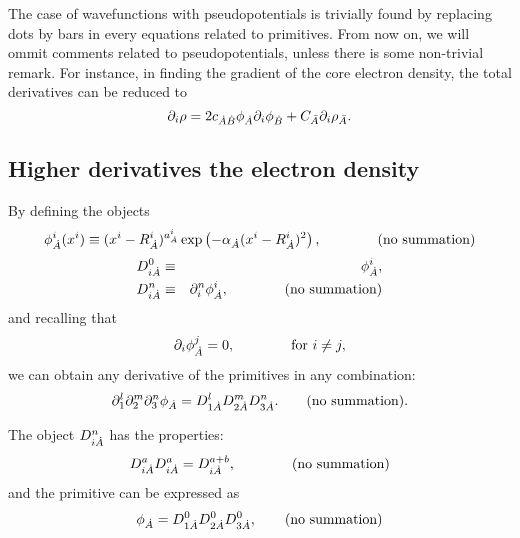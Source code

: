The case of wavefunctions with pseudopotentials is trivially found by replacing 
dots by bars in every equations related to primitives. From now on, we will ommit
comments related to pseudopotentials, unless there is some non-trivial remark.
For instance, in finding the gradient of the core electron density, the total
derivatives can be reduced to
%
\begin{equation}%
   \partial_i\rho=2c_{\dA\dB}\phi_{\dA}\partial_i\phi_{\dB}
   +C_{\bA}\partial_i\rho_{\bA}.
\end{equation}
%


\subsection{Higher derivatives the electron density}

By defining the objects
%
\begin{equation}
   \phi^i_{\dot{A}}(x^i)\equiv(x^i-R^i_{\dot{A}})^{a^i_{\dot{A}}}\exp\left(-\alpha_{\dot{A}}(x^i-R^i_{\dot{A}})^2\right),
   \qquad\qquad\textrm{(no summation)}
\end{equation}
%
%
\begin{eqnarray}
  D_{i\dot{A}}^0&\equiv&\phi^i_{\dot{A}},\nonumber\\
   D_{i\dot{A}}^n&\equiv&\partial_i^n\phi^i_{\dot{A}},\qquad\qquad\textrm{(no summation)}
\end{eqnarray}
%
and recalling that
%
\begin{equation}
   \partial_i\phi^j_{\dot{A}}=0,\qquad\qquad\textrm{for }i\neq j,
\end{equation}
%
we can obtain any derivative of the primitives in any combination:
%
\begin{equation}
  \partial_1^l\partial_2^m\partial_3^n\phi_{\dot{A}}=D_{1\dot{A}}^lD_{2\dot{A}}^mD_{3\dot{A}}^n.
  \qquad\textrm{(no summation)}.
\end{equation}
%

The object $D_{i\dot{A}}^n$ has the properties:
%
\begin{equation}
  D^a_{i\dot{A}}D^a_{i\dot{A}}=D^{a+b}_{i\dot{A}},\qquad\qquad\textrm{(no summation)}
\end{equation}
%
and the primitive can be expressed as
%
\begin{equation}%
  \phi_{\dA}=D^0_{1\dA}D^0_{2\dA}D^0_{3\dA}, \qquad\textrm{(no summation)}
\end{equation}
%


